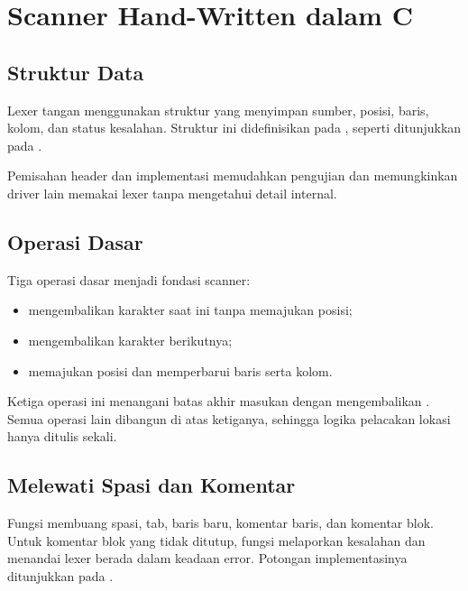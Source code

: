 \section{Scanner Hand-Written dalam C}
\label{sec:ch07-tangan}

\subsection{Struktur Data}

Lexer tangan menggunakan struktur  yang menyimpan sumber,
posisi, baris, kolom, dan status kesalahan. Struktur ini didefinisikan
pada , seperti ditunjukkan pada
.


Pemisahan header dan implementasi memudahkan pengujian dan
memungkinkan driver lain memakai lexer tanpa mengetahui detail
internal.

\subsection{Operasi Dasar}

Tiga operasi dasar menjadi fondasi scanner:
\begin{itemize}[leftmargin=*]
  \item {} mengembalikan karakter saat ini tanpa memajukan
        posisi;
  \item {} mengembalikan karakter berikutnya;
  \item {} memajukan posisi dan memperbarui baris serta
        kolom.
\end{itemize}

Ketiga operasi ini menangani batas akhir masukan dengan
mengembalikan . Semua operasi lain dibangun di atas
ketiganya, sehingga logika pelacakan lokasi hanya ditulis sekali.

\subsection{Melewati Spasi dan Komentar}

Fungsi  membuang spasi, tab, baris baru, komentar
baris, dan komentar blok. Untuk komentar blok yang tidak ditutup,
fungsi melaporkan kesalahan dan menandai lexer berada dalam keadaan
error. Potongan implementasinya ditunjukkan pada
.

